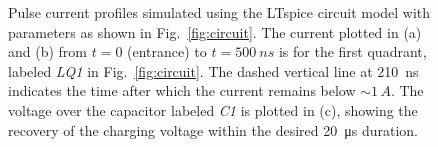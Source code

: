 \begin{refsection}
        
        \begin{figure}
        \centering
        \hfill
        \hfill
        \caption{Pulse current profiles simulated using the LTspice circuit model with parameters as shown in Fig.~\ref{fig:circuit}. The current plotted in (a) and (b) from $t=0$ (entrance) to $t=\SI{500}{ns}$ is for the first quadrant, labeled \textit{LQ1} in Fig.~\ref{fig:circuit}. The dashed vertical line at \SI{210}{ns} indicates the time after which the current remains below $\sim 1\,A$. The voltage over the capacitor labeled \textit{C1} is plotted in (c), showing the recovery of the charging voltage within the desired \SI{20}{\micro s} duration.}
        \label{fig:pulses}
        \end{figure}


\end{refsection}
